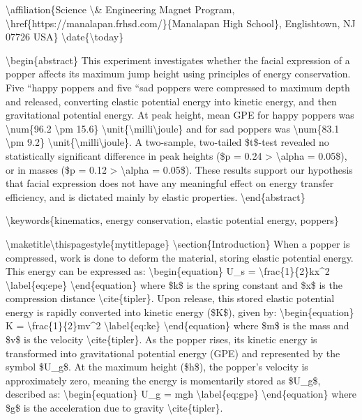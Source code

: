 \textbackslash affiliation\{Science \textbackslash\& Engineering Magnet
Program, \textbackslash href\{https://manalapan.frhsd.com/\}\{Manalapan
High School\}, Englishtown, NJ 07726 USA\}
\textbackslash date\{\textbackslash today\}

\textbackslash begin\{abstract\} This experiment investigates whether
the facial expression of a popper affects its maximum jump height using
principles of energy conservation. Five
``happy\textquotesingle\textquotesingle{} poppers and five
``sad\textquotesingle\textquotesingle{} poppers were compressed to
maximum depth and released, converting elastic potential energy into
kinetic energy, and then gravitational potential energy. At peak height,
mean GPE for happy poppers was \textbackslash num\{96.2
\textbackslash pm 15.6\}
\textbackslash unit\{\textbackslash milli\textbackslash joule\} and for
sad poppers was \textbackslash num\{83.1 \textbackslash pm 9.2\}
\textbackslash unit\{\textbackslash milli\textbackslash joule\}. A
two-sample, two-tailed \$t\$-test revealed no statistically significant
difference in peak heights (\$p = 0.24 \textgreater{}
\textbackslash alpha = 0.05\$), or in masses (\$p = 0.12 \textgreater{}
\textbackslash alpha = 0.05\$). These results support our hypothesis
that facial expression does not have any meaningful effect on energy
transfer efficiency, and is dictated mainly by elastic properties.
\textbackslash end\{abstract\}

\textbackslash keywords\{kinematics, energy conservation, elastic
potential energy, poppers\}

\textbackslash maketitle\textbackslash thispagestyle\{mytitlepage\}
\textbackslash section\{Introduction\} When a popper is compressed, work
is done to deform the material, storing elastic potential energy. This
energy can be expressed as: \textbackslash begin\{equation\} U\_s =
\textbackslash frac\{1\}\{2\}kx\^{}2 \textbackslash label\{eq:epe\}
\textbackslash end\{equation\} where \$k\$ is the spring constant and
\$x\$ is the compression distance \textbackslash cite\{tipler\}. Upon
release, this stored elastic potential energy is rapidly converted into
kinetic energy (\$K\$), given by: \textbackslash begin\{equation\} K =
\textbackslash frac\{1\}\{2\}mv\^{}2 \textbackslash label\{eq:ke\}
\textbackslash end\{equation\} where \$m\$ is the mass and \$v\$ is the
velocity \textbackslash cite\{tipler\}. As the popper rises, its kinetic
energy is transformed into gravitational potential energy (GPE) and
represented by the symbol \$U\_g\$. At the maximum height (\$h\$), the
popper's velocity is approximately zero, meaning the energy is
momentarily stored as \$U\_g\$, described as:
\textbackslash begin\{equation\} U\_g = mgh
\textbackslash label\{eq:gpe\} \textbackslash end\{equation\} where
\$g\$ is the acceleration due to gravity \textbackslash cite\{tipler\}.

